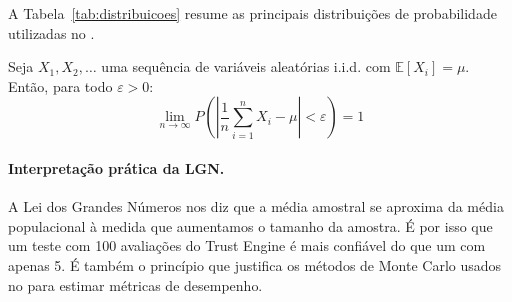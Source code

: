 A Tabela~\ref{tab:distribuicoes} resume as principais distribuições de
probabilidade utilizadas no \opencodeeco{}.

\begin{table}[htb]
    \centering
    \small
    \caption{Distribuições de probabilidade no \opencodeeco{}}
\end{table}

\begin{teorema}
    Seja $X_1, X_2, \ldots$ uma sequência de variáveis aleatórias i.i.d.
    com $\mathbb{E}[X_i] = \mu$. Então, para todo $\varepsilon > 0$:
    \[
    \lim_{n \to \infty} P\left(\left|\frac{1}{n}\sum_{i=1}^n X_i - \mu\right|
    < \varepsilon\right) = 1
    \]
\end{teorema}

\paragraph{Interpretação prática da LGN.} A Lei dos Grandes Números nos diz
que a média amostral se aproxima da média populacional à medida que
aumentamos o tamanho da amostra. É por isso que um teste com 100 avaliações
do Trust Engine é mais confiável do que um com apenas 5. É também o
princípio que justifica os métodos de Monte Carlo usados no \opencodeeco{}
para estimar métricas de desempenho.


